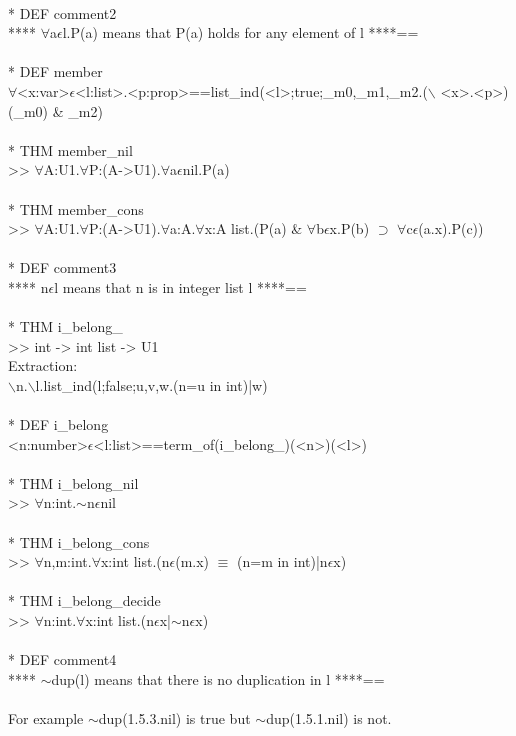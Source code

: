 \N{} \\{}
\N{}* DEF comment2 \\{}
\N{}      **** \(\forall{}\)a\(\epsilon{}\)l.P(a) means that P(a) holds for any element of l ****== \\{}
\N{} \\{}
\N{}* DEF member \\{}
\N{}      \(\forall{}\)<x:var>\(\epsilon{}\)<l:list>.<p:prop>==list\_ind(<l>;true;\_m0,\_m1,\_m2.(\(\backslash{}\) <x>.<p>)(\_m0) \& \_m2) \\{}
\N{} \\{}
\N{}* THM member\_nil \\{}
\N{}      >> \(\forall{}\)A:U1.\(\forall{}\)P:(A->U1).\(\forall{}\)a\(\epsilon{}\)nil.P(a) \\{}
\N{} \\{}
\N{}* THM member\_cons \\{}
\N{}      >> \(\forall{}\)A:U1.\(\forall{}\)P:(A->U1).\(\forall{}\)a:A.\(\forall{}\)x:A list.(P(a) \& \(\forall{}\)b\(\epsilon{}\)x.P(b) \(\supset{}\) \(\forall{}\)c\(\epsilon{}\)(a.x).P(c)) \\{}
\N{} \\{}
\N{}* DEF comment3 \\{}
\N{}      **** n\(\epsilon{}\)l means that n is in integer list l ****== \\{}
\N{} \\{}
\N{}* THM i\_belong\_ \\{}
\N{}      >> int -> int list -> U1 \\{}
\N{}      Extraction: \\{}
\N{}      \(\backslash{}\)n.\(\backslash{}\)l.list\_ind(l;false;u,v,w.(n=u in int)|w) \\{}
\N{} \\{}
\N{}* DEF i\_belong \\{}
\N{}      <n:number>\(\epsilon{}\)<l:list>==term\_of(i\_belong\_)(<n>)(<l>) \\{}
\N{} \\{}
\N{}* THM i\_belong\_nil \\{}
\N{}      >> \(\forall{}\)n:int.\(\sim{}\)n\(\epsilon{}\)nil \\{}
\N{} \\{}
\N{}* THM i\_belong\_cons \\{}
\N{}      >> \(\forall{}\)n,m:int.\(\forall{}\)x:int list.(n\(\epsilon{}\)(m.x) \(\equiv{}\) (n=m in int)|n\(\epsilon{}\)x) \\{}
\N{} \\{}
\N{}* THM i\_belong\_decide \\{}
\N{}      >> \(\forall{}\)n:int.\(\forall{}\)x:int list.(n\(\epsilon{}\)x|\(\sim{}\)n\(\epsilon{}\)x) \\{}
\N{} \\{}
\N{}* DEF comment4 \\{}
\N{}      **** \(\sim{}\)dup(l) means that there is no duplication in l ****== \\{}
\N{}       \\{}
\N{}      For example \(\sim{}\)dup(1.5.3.nil) is true but \(\sim{}\)dup(1.5.1.nil) is not. \\{}

